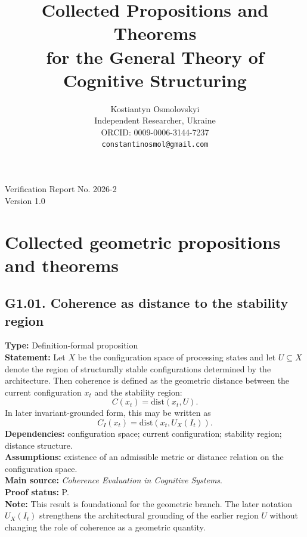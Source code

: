 \documentclass[12pt]{article}
\title{Collected Propositions and Theorems \\
	\small for the General Theory of Cognitive Structuring}
\author{
	Kostiantyn Osmolovskyi\\
	\small Independent Researcher, Ukraine\\
	\small ORCID: 0009-0006-3144-7237\\
	\small \texttt{constantinosmol@gmail.com}
}
\date{}
\begin{document}
	\maketitle

\begin{center}
	\small
	Verification Report No. 2026-2\\
	Version 1.0
\end{center}

\vspace{0.5em}	
	
	\section{Collected geometric propositions and theorems}
	
	\subsection*{G1.01. Coherence as distance to the stability region}
	\textbf{Type:} Definition-formal proposition \\
	\textbf{Statement:} Let $X$ be the configuration space of processing states and let
	$U \subseteq X$ denote the region of structurally stable configurations determined by the
	architecture. Then coherence is defined as the geometric distance between the current
	configuration $x_t$ and the stability region:
	\[
	C(x_t) = \mathrm{dist}(x_t,U).
	\]
	In later invariant-grounded form, this may be written as
	\[
	C_I(x_t) = \mathrm{dist}(x_t,U_X(I_t)).
	\]
	\textbf{Dependencies:} configuration space; current configuration; stability region; distance structure. \\
	\textbf{Assumptions:} existence of an admissible metric or distance relation on the configuration space. \\
	\textbf{Main source:} \emph{Coherence Evaluation in Cognitive Systems}. \\
	\textbf{Proof status:} P. \\
	\textbf{Note:} This result is foundational for the geometric branch. The later notation
	$U_X(I_t)$ strengthens the architectural grounding of the earlier region $U$ without changing
	the role of coherence as a geometric quantity.
	
\end{document}
